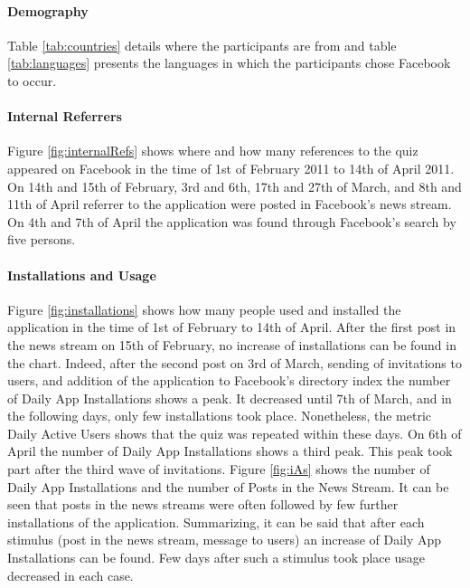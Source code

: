 \documentclass[preprint,12pt]{elsarticle}
\begin{document}
\paragraph{Demography}
\label{sec:demographie}
Table \ref{tab:countries} details where the participants are from and table
\ref{tab:languages} presents the languages in which the participants chose
Facebook to occur.

\paragraph{Internal Referrers}
\label{sec:internal-referrers}
Figure \ref{fig:internalRefs} shows where and how many references to the quiz 
appeared on Facebook in the time of 1st of February 2011 to 14th of April
2011. On 14th and 15th of February, 3rd and 6th, 17th and 27th of
March, and 8th and 11th of April referrer to the application were
posted in Facebook's news stream. On 4th and 7th of April the
application was found through Facebook's search by five persons.

\paragraph{Installations and Usage}
\label{sec:user-response}
Figure \ref{fig:installations} shows how many people used and
installed the application in the time of 1st of February to 14th of
April. After the first post in the news stream on 15th of February, no
increase of installations can be found in the chart. Indeed, after the
second post on 3rd of March, sending of invitations to users, and addition of the application to
Facebook's directory index the number of Daily App Installations shows a
peak. It decreased until 7th of March,
and in the following days, only few installations took
place. Nonetheless, the metric Daily Active Users shows that the quiz
was repeated within these days. On 6th of April the number of
Daily App Installations shows a third peak. This peak took part after
the third wave of invitations. 
Figure \ref{fig:iAs} shows the number of Daily App Installations and the
number of Posts in the News Stream. It can be seen that posts in the
news streams were often followed by few further installations of the application.
Summarizing, it can be said that after each stimulus (post in the news
stream, message to users) an increase of Daily App Installations can
be found. Few days after such a stimulus took place usage decreased in each case.

\end{document}
